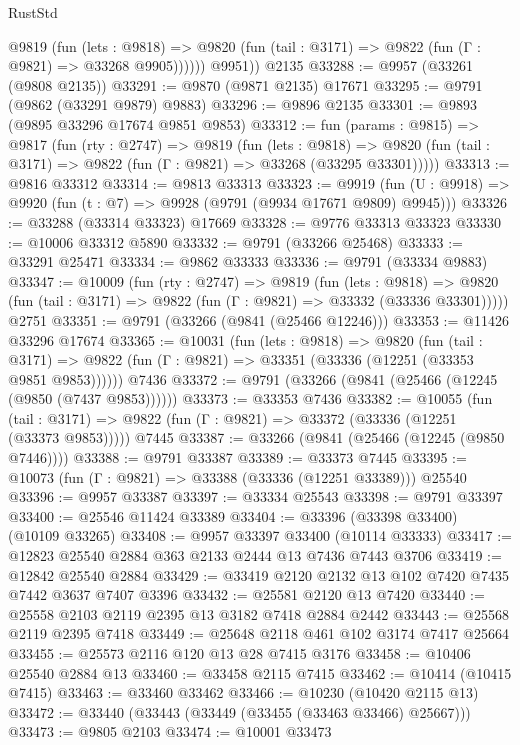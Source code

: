 \begin{lexlean}{RustStd}
\begin{coremodule}
            @9819
              (fun (lets : @9818) =>
              @9820 (fun (tail : @3171) => @9822 (fun (Γ : @9821) => @33268 @9905))))))
        @9951))
    @2135
@33288 := @9957 (@33261 (@9808 @2135))
@33291 := @9870 (@9871 @2135) @17671
@33295 := @9791 (@9862 (@33291 @9879) @9883)
@33296 := @9896 @2135
@33301 := @9893 (@9895 @33296 @17674 @9851 @9853)
@33312 := fun (params : @9815) =>
  @9817
    (fun (rty : @2747) =>
    @9819
      (fun (lets : @9818) =>
      @9820 (fun (tail : @3171) => @9822 (fun (Γ : @9821) => @33268 (@33295 @33301)))))
@33313 := @9816 @33312
@33314 := @9813 @33313
@33323 := @9919
    (fun (U : @9918) => @9920 (fun (t : @7) => @9928 (@9791 (@9934 @17671 @9809) @9945)))
@33326 := @33288 (@33314 @33323) @17669
@33328 := @9776 @33313 @33323
@33330 := @10006 @33312 @5890
@33332 := @9791 (@33266 @25468)
@33333 := @33291 @25471
@33334 := @9862 @33333
@33336 := @9791 (@33334 @9883)
@33347 := @10009
    (fun (rty : @2747) =>
    @9819
      (fun (lets : @9818) =>
      @9820 (fun (tail : @3171) => @9822 (fun (Γ : @9821) => @33332 (@33336 @33301)))))
    @2751
@33351 := @9791 (@33266 (@9841 (@25466 @12246)))
@33353 := @11426 @33296 @17674
@33365 := @10031
    (fun (lets : @9818) =>
    @9820
      (fun (tail : @3171) =>
      @9822 (fun (Γ : @9821) => @33351 (@33336 (@12251 (@33353 @9851 @9853))))))
    @7436
@33372 := @9791 (@33266 (@9841 (@25466 (@12245 (@9850 (@7437 @9853))))))
@33373 := @33353 @7436
@33382 := @10055
    (fun (tail : @3171) => @9822 (fun (Γ : @9821) => @33372 (@33336 (@12251 (@33373 @9853)))))
    @7445
@33387 := @33266 (@9841 (@25466 (@12245 (@9850 @7446))))
@33388 := @9791 @33387
@33389 := @33373 @7445
@33395 := @10073 (fun (Γ : @9821) => @33388 (@33336 (@12251 @33389))) @25540
@33396 := @9957 @33387
@33397 := @33334 @25543
@33398 := @9791 @33397
@33400 := @25546 @11424 @33389
@33404 := @33396 (@33398 @33400) (@10109 @33265)
@33408 := @9957 @33397 @33400 (@10114 @33333)
@33417 := @12823 @25540 @2884 @363 @2133 @2444 @13 @7436 @7443 @3706
@33419 := @12842 @25540 @2884
@33429 := @33419 @2120 @2132 @13 @102 @7420 @7435 @7442 @3637 @7407 @3396
@33432 := @25581 @2120 @13 @7420
@33440 := @25558 @2103 @2119 @2395 @13 @3182 @7418 @2884 @2442
@33443 := @25568 @2119 @2395 @7418
@33449 := @25648 @2118 @461 @102 @3174 @7417 @25664
@33455 := @25573 @2116 @120 @13 @28 @7415 @3176
@33458 := @10406 @25540 @2884 @13
@33460 := @33458 @2115 @7415
@33462 := @10414 (@10415 @7415)
@33463 := @33460 @33462
@33466 := @10230 (@10420 @2115 @13)
@33472 := @33440 (@33443 (@33449 (@33455 (@33463 @33466) @25667)))
@33473 := @9805 @2103
@33474 := @10001 @33473

\end{coremodule}
\end{lexlean}
